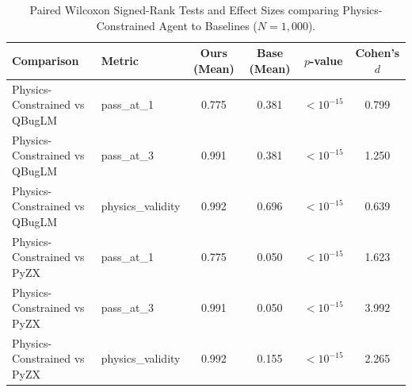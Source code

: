 \begin{table}[t]
\centering
\caption{Paired Wilcoxon Signed-Rank Tests and Effect Sizes comparing Physics-Constrained Agent to Baselines ($N=1,000$).}
\label{tab:wilcoxon_tests}
\begin{tabular}{llcccc}
\hline
Comparison & Metric & Ours (Mean) & Base (Mean) & $p$-value & Cohen's $d$ \\
\hline
Physics-Constrained vs QBugLM & pass_at_1 & 0.775 & 0.381 & $< 10^{-15}$ & 0.799 \\
Physics-Constrained vs QBugLM & pass_at_3 & 0.991 & 0.381 & $< 10^{-15}$ & 1.250 \\
Physics-Constrained vs QBugLM & physics_validity & 0.992 & 0.696 & $< 10^{-15}$ & 0.639 \\
Physics-Constrained vs PyZX & pass_at_1 & 0.775 & 0.050 & $< 10^{-15}$ & 1.623 \\
Physics-Constrained vs PyZX & pass_at_3 & 0.991 & 0.050 & $< 10^{-15}$ & 3.992 \\
Physics-Constrained vs PyZX & physics_validity & 0.992 & 0.155 & $< 10^{-15}$ & 2.265 \\
\hline
\end{tabular}
\end{table}
